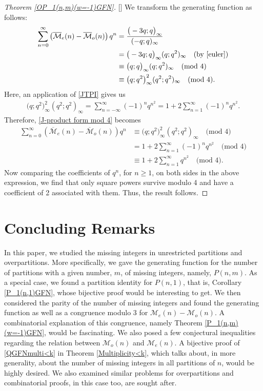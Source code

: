 \documentclass[12pt,reqno]{amsart}
\renewcommand{\(}{\left\(}
\renewcommand{\)}{\right\)}
\renewcommand{\[}{\left\[}
\renewcommand{\]}{\right\]}
\numberwithin{equation}{section}
\theoremstyle{plain}
\begin{document}
\begin{proof}[Theorem \textup{\ref{OP_1(n,m)(w=-1)GFN}}][]
We transform the generating function as follows:
\begin{align}
\sum_{n=0}^{\infty}\left(\overline{\mathcal{M}}_e(n)-\overline{\mathcal{M}}_o(n)\right)q^n&=\frac{\big(-3q;q\big)_{\infty}}{(-q;q)_{\infty}}\nonumber\\&=\big(-3q;q\big)_{\infty}(q;q^2)_{\infty} \quad (\text{by \eqref{euler}})\nonumber\\
&\equiv \big(q;q\big)_{\infty}(q;q^2)_{\infty} \quad\text{(mod 4)}\nonumber\\
&\equiv \big(q;q^2\big)^2_{\infty}(q^2;q^2)_{\infty} \quad\text{(mod 4)}.\label{J-product form mod 4}
\end{align}
Here, an application of \eqref{JTPI} gives us
\begin{align*}
\big(q;q^2\big)^2_{\infty}(q^2;q^2)_{\infty}=\sum_{n=-\infty}^{\infty}(-1)^n q^{n^2}=1+2\sum_{n=1}^{\infty}(-1)^n q^{n^2}.
\end{align*}
Therefore, \eqref{J-product form mod 4} becomes
\begin{align*}
\sum_{n=0}^{\infty}\left(\overline{\mathcal{M}}_e(n)-\overline{\mathcal{M}}_o(n)\right)q^n&\equiv \big(q;q^2\big)^2_{\infty}(q^2;q^2)_{\infty} \quad\text{(mod 4)}\\ & = 1+2\sum_{n=1}^{\infty}(-1)^n q^{n^2}\quad\text{(mod 4)}\\ & \equiv 1+2\sum_{n=1}^{\infty}q^{n^2}\quad\text{(mod 4)}.
\end{align*}
Now comparing the coefficients of $q^n$, for $n\geq 1$, on both sides in the above expression, we find that only square powers survive modulo 4 and have a coefficient of 2 associated with them. Thus, the result follows.
\end{proof}

\section{Concluding Remarks}
In this paper, we studied the missing integers in unrestricted partitions and overpartitions. More specifically, we gave the generating function for the number of partitions with a given number, $m$, of missing integers, namely, $P(n, m)$. As a special case, we found a partition identity for $P(n, 1)$, that is, Corollary \ref{P_1(n,1)GFN}, whose bijective proof would be interesting to get. We then considered the parity of the number of missing integers and found the generating function as well as a congruence modulo $3$ for $\mathcal{M}_e(n) - \mathcal{M}_o(n)$. A combinatorial explanation of this congruence, namely Theorem \ref{P_1(n,m)(w=-1)GFN}, would be fascinating. We also posed a few conjectural inequalities regarding the relation between $\mathcal{M}_o(n)$ and $\mathcal{M}_e(n)$. A bijective proof of \eqref{QGFNmulti<k} in Theorem \ref{Multiplicity<k}, which talks about, in more generality, about the number of missing integers in all partitions of $n$, would be highly desired. We also examined similar problems for overpartitions and combinatorial proofs, in this case too, are sought after.
\end{document}
